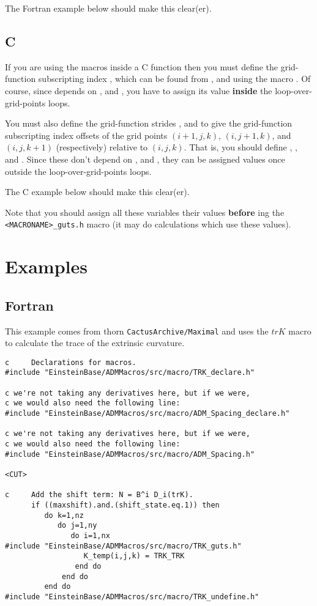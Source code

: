 The Fortran example below should make this clear(er).

\subsection{C}

If you are using the macros inside a C function then you must define
the grid-function subscripting index , which can be found
from ,  and  using the macro
.  Of course, since 
depends on ,  and , you have to assign
 its value \textbf{inside} the loop-over-grid-points loops.

You must also define the grid-function strides , 
and  to give the grid-function subscripting index offsets of
the grid points $(i+1,j,k)$, $(i,j+1,k)$, and $(i,j,k+1)$ (respectively)
relative to $(i,j,k)$.  That is, you should define ,
, and .
Since these don't depend on ,  and ,
they can be assigned values once outside the loop-over-grid-points loops.

The C example below should make this clear(er).

Note that you should assign all these variables their values \textbf{before}
ing the \texttt{<MACRONAME>\_guts.h} macro (it may do
calculations which use these values).


\section{Examples}

\subsection{Fortran}

This example comes from thorn \texttt{CactusArchive/Maximal} and uses
the $trK$ macro to calculate the trace of the extrinsic curvature.

\newpage	%
\begin{verbatim}
c     Declarations for macros.
#include "EinsteinBase/ADMMacros/src/macro/TRK_declare.h"

c we're not taking any derivatives here, but if we were,
c we would also need the following line:
#include "EinsteinBase/ADMMacros/src/macro/ADM_Spacing_declare.h"

c we're not taking any derivatives here, but if we were,
c we would also need the following line:
#include "EinsteinBase/ADMMacros/src/macro/ADM_Spacing.h"

<CUT>

c     Add the shift term: N = B^i D_i(trK).
      if ((maxshift).and.(shift_state.eq.1)) then
         do k=1,nz
            do j=1,ny
               do i=1,nx
#include "EinsteinBase/ADMMacros/src/macro/TRK_guts.h"
                  K_temp(i,j,k) = TRK_TRK
                end do
             end do
         end do
#include "EinsteinBase/ADMMacros/src/macro/TRK_undefine.h"
\end{verbatim}

